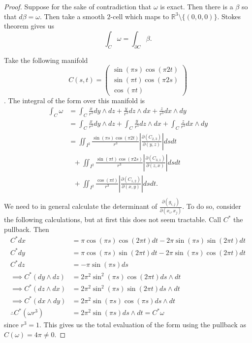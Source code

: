 \documentclass[letter]{article}
\newenvironment{menumerate}{%
  \edef\backupindent{\the\parindent}%
  \enumerate%
  \setlength{\parindent}{\backupindent}%
}{\endenumerate}
\begin{document}
\begin{menumerate}
\begin{proof}
		Suppose for the sake of contradiction that $\omega$ is exact. Then there is a $\beta$ so that $d\beta = \omega.$
		Then take a smooth $2$-cell which maps to $\mathbb{R}^3 \setminus \{(0,0,0)\}.$ Stokes theorem gives us
		\begin{equation}
			\int_C \omega = \int_{\partial C} \beta.	
		\end{equation}

		Take the following manifold
		\begin{equation}
			C(s,t) = \begin{pmatrix}
					\sin(\pi s)\cos(\pi 2t) \\
					\sin(\pi t)\cos(\pi 2s) \\
					\cos(\pi t)
				\end{pmatrix}	
		\end{equation}.
		The integral of the form over this manifold is
		\begin{equation}
			\begin{aligned}
				\int_C \omega &= \int_C \frac{x}{r^3}dy \wedge dz + \frac{y}{r^3}dz \wedge dx + \frac{z}{r^3}dx \wedge dy \\
				&= \int_C \frac{x}{r^3}dy \wedge dz + \int_C \frac{y}{r^3}dz \wedge dx + \int_C \frac{z}{r^3}dx \wedge dy \\
				&=        \iint_{I^2} \frac{\sin(\pi s)\cos(\pi 2t)}{r^3}  \left|\frac{\partial(C_{2,3})}{\partial(y,z)}\right| dsdt   \\
				&\ \ \  + \iint_{I^2} \frac{\sin(\pi t)\cos(\pi 2s)}{r^3}  \left|\frac{\partial(C_{3,1})}{\partial(z,x)}\right| dsdt \\
				&\ \ \  + \iint_{I^2} \frac{\cos(\pi t)}{r^3}  \left|\frac{\partial(C_{1,2})}{\partial(x,y)}\right| dsdt. \\
			\end{aligned}
		\end{equation}
		We need to in general calculate the determinant of $\frac{\partial(g_{i,j})}{\partial(x_i,x_j)}.$ To do so,
		consider the following calculations, but at first this does not seem tractable.
		Call $C^*$ the pullback.
		Then
		\begin{equation}
			\begin{aligned}
				C^* dx &= \pi \cos (\pi s) \cos(2\pi t)dt - 2\pi \sin (\pi s)\sin(2\pi t) dt \\
				C^* dy &=  \pi \cos (\pi s) \sin(2\pi t)dt - 2\pi \sin (\pi s)\cos(2\pi t) dt \\ 
				C^* dz &=  - \pi \sin (\pi s) ds \\
				\implies C^*(dy \wedge dz) &= 2\pi^2 \sin^2(\pi s)\cos(2\pi t) ds \wedge dt \\
				\implies C^*(dz \wedge dx) &=  2\pi^2 \sin^2(\pi s)\sin (2\pi t) ds \wedge dt \\
				\implies C^*(dx \wedge dy) &= 2\pi^2 \sin(\pi s) \cos(\pi s) ds \wedge dt  \\
				\therefore C^*(\omega r^3) &= 2\pi^2 \sin (\pi s) ds \wedge dt = C^*\omega
			\end{aligned}
		\end{equation}
		since $r^3 = 1.$ This gives us the total evaluation of the form using the pullback
		as $C(\omega) = 4\pi \neq 0.$


\end{proof}
\end{menumerate}
\end{document}
